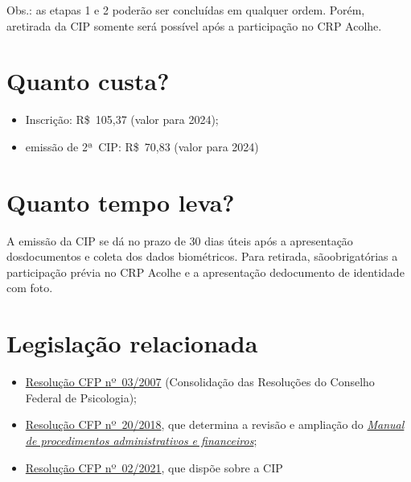 Obs.: as etapas 1 e 2 poderão ser concluídas em qualquer ordem. Porém, aretirada da CIP somente será possível após a participação no CRP Acolhe.

\section{Quanto custa?}

\begin{itemize}
  \item  Inscrição: R\$~105,37 (valor para 2024);
  \item  emissão de 2ª~CIP: R\$~70,83 (valor para 2024)
\end{itemize}

\section{Quanto tempo leva?}

A emissão da CIP se dá no prazo de 30 dias úteis após a apresentação dosdocumentos e coleta dos dados biométricos. Para retirada, sãoobrigatórias a participação prévia no CRP Acolhe e a apresentação dedocumento de identidade com foto.

\section{Legislação relacionada}

\begin{itemize}
  \item  \href{https://atosoficiais.com.br/cfp/resolucao-administrativa-financeira-n-3-2007-institui-a-consolidacao-das-resolucoes-do-conselho-federal-de-psicologia?origin=instituicao&q=resolu\%C3\%A7\%C3\%A3o\%203/2007}{Resolução  CFP nº~03/2007} (Consolidação das Resoluções do Conselho Federal de  Psicologia);
  \item  \href{https://atosoficiais.com.br/cfp/resolucao-administrativa-financeira-n-20-2018-altera-o-manual-de-procedimentos-administrativo-e-financeiro-do-sistema-conselhos-de-psicologia-anexo-da-resolucao-cfp-n-202018-a-resolucao-cfp-n-03-2007-a-resolucao-cfp-n-16-2019-e-da-outras-providencias}{Resolução  CFP nº~20/2018}, que determina a revisão e ampliação do  \href{https://transparencia.cfp.org.br/wp-content/uploads/sites/7/2020/05/Manual-de-Procedimentos-Administrativos-e-Financeiro-CFP-RES-20.2018.pdf}{\emph{Manual  de procedimentos administrativos e financeiros}};
  \item  \href{https://atosoficiais.com.br/cfp/resolucao-administrativa-financeira-n-2-2021-dispoe-sobre-a-confeccao-a-expedicao-e-o-recolhimento-de-carteiras-de-identidade-profissional-das-os-psicologas-os-revoga-o-capitulo-vi-da-resolucao-cfp-no-03-2007-os-1o-2o-4o-5o-do-art-2o-da-resolucao-cfp-no-02-2007-1o-4o-5o-do-art-2o-e-1o-do-art-4o-da-resolucao-cfp-no-01-1984-e-da-outras-providencias}{Resolução  CFP nº~02/2021}, que dispõe sobre a CIP
\end{itemize}

